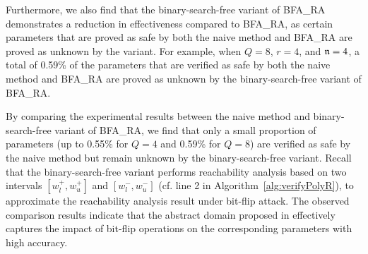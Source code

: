 Furthermore, we also find that the binary-search-free variant of {\sf BFA\_RA} demonstrates a reduction in effectiveness compared to {\sf BFA\_RA}, as certain parameters that are proved as safe by both the naive method and {\sf BFA\_RA} are proved as unknown by the variant. 
For example, when $Q=8$, $r=4$, and $\mathfrak{n}=4$, a total of 0.59\% of the parameters that are verified as safe by both the naive method and {\sf BFA\_RA} are proved as unknown by the binary-search-free variant of {\sf BFA\_RA}.

\vspace{1mm}
\noindent
\setlength{\fboxsep}{3pt}%
\setlength{\fboxrule}{1pt}%
\vspace{1mm}

By comparing the experimental results between the naive method and binary-search-free variant of {\sf BFA\_RA}, we find that only a small proportion of parameters (up to 0.55\% for $Q=4$ and 0.59\% for $Q=8$) are verified as safe by the naive method but remain unknown by the binary-search-free variant. Recall that the binary-search-free variant performs reachability analysis based on two intervals $[w^+_l,w^+_u]$ and $[w^-_l,w^-_u]$ (cf. line 2 in Algorithm~\ref{alg:verifyPolyR}), to approximate the reachability analysis result under bit-flip attack. The observed comparison results indicate that the abstract domain proposed in \symPoly effectively captures the impact of bit-flip operations on the corresponding parameters with high accuracy.  

\vspace{1mm}
\noindent
\setlength{\fboxsep}{3pt}%
\setlength{\fboxrule}{1pt}%

